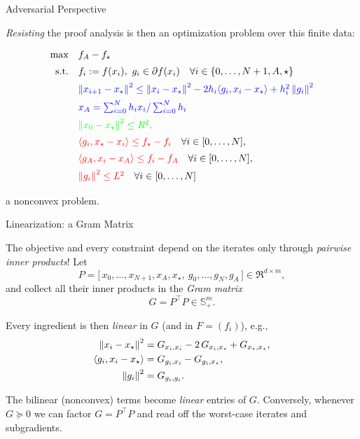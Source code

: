 \documentclass[9pt]{beamer}
\begin{document}
\begin{frame}{Adversarial Perspective}

  \emph{Resisting} the proof analysis is then an optimization problem over this finite data:

    \begin{equation*}
      \begin{array}{rl}
        \max &  f_A-f_\star\\[0.5em]
        \mathrm{s.t.}  & f_i := f(x_i), ~g_i \in \partial f(x_i) \quad \forall i \in \{0, \dots, N+1, A, \star\} \\[0.5em]
             & {\color{blue} \left\| x_{i+1}-x_\star\right\|^2\leq \left\|x_i-x_\star\right\|^2 - 2 h_i \langle g_i , x_i -x_\star \rangle + h_i^2 \left\|g_i\right\|^2} \\[0.5em]
                    & {\color{blue} x_A= \sum_{i=0}^N h_i x_i/\sum_{i=0}^N h_i}\\[0.5em]
                                     & \color{green}{\left\|x_0-x_\star\right\|^2\leq R^2},\\[0.5em]
                                     & {\color{red} \langle  g_i, x_\star-x_i\rangle \leq f_\star-f_i} \quad \forall i\in [0, \dots, N], \\[0.5em]
                                                & {\color{red} \langle g_A, x_i-x_A\rangle \leq f_i-f_A} \quad \forall i\in [0, \dots, N],\\[0.5em]
                   & {\color{red} \left\| g_i\right\|^2\leq L^2} \quad \forall i\in [0, \dots, N]\\[0.5em]
      \end{array}
    \end{equation*}
    a nonconvex problem.

\end{frame}

\begin{frame}{Linearization: a Gram Matrix}

  The objective and every constraint depend on the iterates only through
  \emph{pairwise inner products}!
  \vfill
  Let
  \[
    P = \big[\, x_0, \dots, x_{N+1}, x_A, x_\star, ~ g_0, \dots, g_N, g_A \,\big] \in \Re^{d \times m},
  \]
  and collect all their inner products in the \emph{Gram matrix}
  \[
    G = P^\top P \in \mathbb{S}_+^m.
  \]

  \vfill

  Every ingredient is then \emph{linear} in $G$ (and in $F = (f_i)$), e.g.,
  \begin{align*}
    \left\|x_i - x_\star\right\|^2 &= G_{x_i, x_i} - 2\, G_{x_i, x_\star} + G_{x_\star, x_\star}, \\
    \langle g_i, x_i - x_\star \rangle &= G_{g_i, x_i} - G_{g_i, x_\star}, \\
    \left\|g_i\right\|^2 &= G_{g_i, g_i}.
  \end{align*}

  \vfill

  The bilinear (nonconvex) terms become \emph{linear} entries of $G$. Conversely,
  whenever $G \succeq 0$ we can factor $G = P^\top P$ and read off the worst-case iterates
  and subgradients.

\end{frame}
\end{document}
